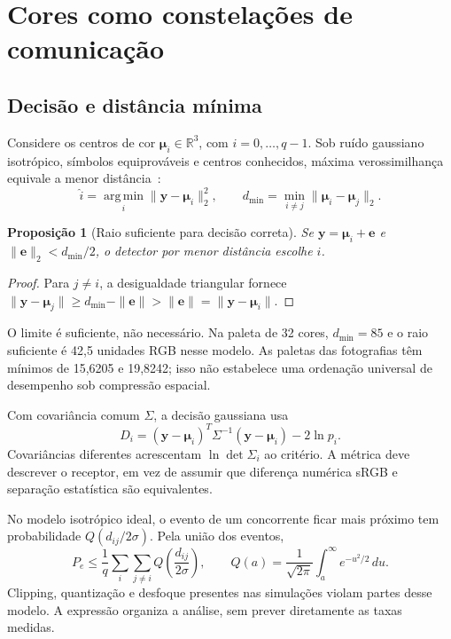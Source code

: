 \documentclass[11pt,a4paper]{article}
\newcommand{\argmin}{\operatorname*{arg\,min}}
\newtheorem{proposition}{Proposição}
\begin{document}
\section{Cores como constelações de comunicação}
\subsection{Decisão e distância mínima}
Considere os centros de cor $\boldsymbol\mu_i\in\mathbb R^3$, com $i=0,\ldots,q-1$. Sob ruído gaussiano isotrópico, símbolos equiprováveis e centros conhecidos, máxima verossimilhança equivale a menor distância~\cite{2005forneySignals}:
\begin{equation}
\widehat i=\argmin_i\|\mathbf y-\boldsymbol\mu_i\|_2^2,\qquad
d_{\min}=\min_{i\ne j}\|\boldsymbol\mu_i-\boldsymbol\mu_j\|_2.
\end{equation}
\begin{proposition}[Raio suficiente para decisão correta]
Se $\mathbf y=\boldsymbol\mu_i+\mathbf e$ e $\|\mathbf e\|_2<d_{\min}/2$, o detector por menor distância escolhe $i$.
\end{proposition}
\begin{proof}
Para $j\ne i$, a desigualdade triangular fornece $\|\mathbf y-\boldsymbol\mu_j\|\ge d_{\min}-\|\mathbf e\|>\|\mathbf e\|=\|\mathbf y-\boldsymbol\mu_i\|$.
\end{proof}
O limite é suficiente, não necessário. Na paleta de 32 cores, $d_{\min}=85$ e o raio suficiente é 42,5 unidades RGB nesse modelo. As paletas das fotografias têm mínimos de 15,6205 e 19,8242; isso não estabelece uma ordenação universal de desempenho sob compressão espacial.

Com covariância comum $\Sigma$, a decisão gaussiana usa
\begin{equation}
D_i=(\mathbf y-\boldsymbol\mu_i)^T\Sigma^{-1}(\mathbf y-\boldsymbol\mu_i)-2\ln p_i.
\end{equation}
Covariâncias diferentes acrescentam $\ln\det\Sigma_i$ ao critério. A métrica deve descrever o receptor, em vez de assumir que diferença numérica sRGB e separação estatística são equivalentes.

No modelo isotrópico ideal, o evento de um concorrente ficar mais próximo tem probabilidade $Q(d_{ij}/2\sigma)$. Pela união dos eventos,
\begin{equation}
P_e\le\frac1q\sum_i\sum_{j\ne i}Q\left(\frac{d_{ij}}{2\sigma}\right),\qquad
Q(a)=\frac1{\sqrt{2\pi}}\int_a^\infty e^{-u^2/2}\,du.
\end{equation}
Clipping, quantização e desfoque presentes nas simulações violam partes desse modelo. A expressão organiza a análise, sem prever diretamente as taxas medidas.
\end{document}
